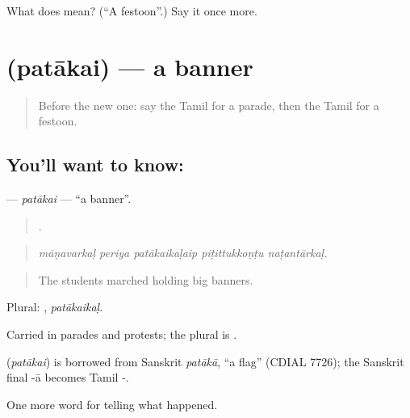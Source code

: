 \begin{tcolorbox}[breakable,colback=teal!4,colframe=teal!35!black,title={Before you move on}]
What does  mean? (\textquotedblleft{}A festoon\textquotedblright{}.) Say it once more.
\end{tcolorbox}
\section[\texorpdfstring{\ta{பதாகை} (patākai)}{பதாகை (patākai)}]{ (patākai) — a banner}

\label{lesson:TA-C320-patakai}



\begin{quote}
Before the new one: say the Tamil for a parade, then the Tamil for a festoon.
\end{quote}

\subsection*{You'll want to know: }
\textbf{} — \emph{patākai} — \textquotedblleft{}a banner\textquotedblright{}.

\begin{quote}
    .
\end{quote}

\begin{quote}
\emph{māṇavarkaḷ periya patākaikaḷaip piṭittukkoṇṭu naṭantārkaḷ.}
\end{quote}

\begin{quote}
The students marched holding big banners.
\end{quote}

Plural: , \emph{patākaikaḷ}.

Carried in parades and protests; the plural is .

\begin{cousinweb}
\textbf{} (\emph{patākai}) is borrowed from Sanskrit \emph{patākā}, \textquotedblleft{}a flag\textquotedblright{} (CDIAL 7726); the Sanskrit final -ā becomes Tamil -.
\end{cousinweb}

\begin{grammarlens}[title={What you've built}]
One more word for telling what happened.
\end{grammarlens}

